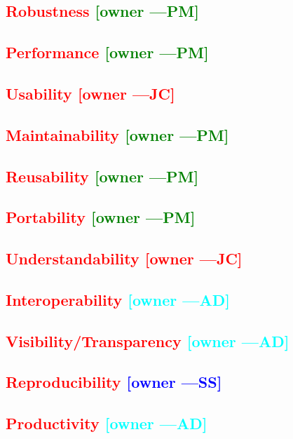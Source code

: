 \documentclass[letterpaper,cleveref]{lipics-v2019}
\newcommand{\authornote}[3]{\textcolor{#1}{[#3 ---#2]}}
\newcommand{\authornote}[3]{}
\newcommand{\wss}[1]{\authornote{blue}{SS}{#1}} %
\newcommand{\jc}[1]{\authornote{red}{JC}{#1}} %
\newcommand{\pmi}[1]{\authornote{green}{PM}{#1}} %
\newcommand{\ad}[1]{\authornote{cyan}{AD}{#1}} %
\newcommand{\notdone}[1]{\textcolor{red}{#1}}
\theoremstyle{definition}
\begin{document}
\subsection{\notdone{Robustness} \pmi{owner}}

\subsection{\notdone{Performance} \pmi{owner}}

\subsection{\notdone{Usability} \jc{owner}} 

\subsection{\notdone{Maintainability} \pmi{owner}}

\subsection{\notdone{Reusability} \pmi{owner}}

\subsection{\notdone{Portability} \pmi{owner}}

\subsection{\notdone{Understandability} \jc{owner}}

\subsection{\notdone{Interoperability} \ad{owner}}

\subsection{\notdone{Visibility/Transparency} \ad{owner}}

\subsection{\notdone{Reproducibility} \wss{owner}}

\subsection{\notdone{Productivity} \ad{owner}}
\end{document}
